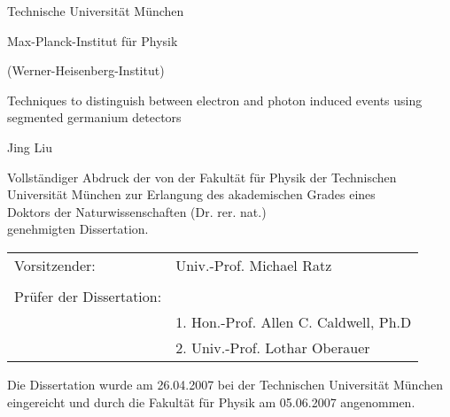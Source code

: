 
\begin{titlepage}

\centering

\vspace{1.0cm}

\begin{center}

{\Huge Technische Universit\"at M\"unchen}

\vspace{1.5 cm}

{\Large Max-Planck-Institut f\"ur Physik \\}

\vspace{0.5 cm} 

{\Large (Werner-Heisenberg-Institut)} 

\vspace{1.5 cm}

{\Large Techniques to distinguish between electron and photon induced
events using segmented germanium detectors}

\vspace{1.5 cm}

{\Large Jing Liu\\}

\end{center} 

\vspace{1.5 cm}

\begin{center}
Vollst\"andiger Abdruck der von der Fakult\"at f\"ur Physik der
Technischen Universit\"at M\"unchen zur Erlangung des akademischen
Grades eines \\Doktors der Naturwissenschaften (Dr. rer. nat.) \\ 
genehmigten Dissertation. \\
\end{center}

\vspace{1.5 cm} 

\begin{table*}[h]
\center
\begin{tabular}{ll}
Vorsitzender: & \phantom{1.} Univ.-Prof. Michael Ratz\\ 
& \\ 
Pr\"ufer der Dissertation: & \\ 
& 1. Hon.-Prof. Allen C. Caldwell, Ph.D \\ 
& 2. Univ.-Prof. Lothar Oberauer \\ 
\end{tabular}
\end{table*}

\vspace{2.0 cm} 

\begin{center}
Die Dissertation wurde am 26.04.2007 bei der Technischen Universit\"at
M\"unchen eingereicht und durch die Fakult\"at f\"ur Physik am
05.06.2007 angenommen. \\
\end{center}

\end{titlepage} 

